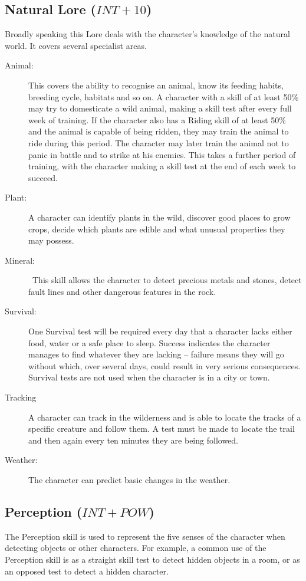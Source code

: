 \subsection{Natural Lore ($INT+10$)}
Broadly speaking this Lore deals with the character’s knowledge of the natural world. It covers several specialist areas.
\begin{description}
	\item[Animal:] This covers the ability to recognise an animal, know its feeding habits, breeding cycle, habitats and so on. A character with a skill of at least 50\% may try to domesticate a wild animal, making a skill test after every full week of training. If the character also has a Riding skill of at least 50\% and the animal is capable of being ridden, they may train the animal to ride during this period. The character may later train the animal not to panic in battle and to strike at his enemies. This takes a further period of training, with the character making a skill test at the end of each week to succeed. 
	\item[Plant:] A character can identify plants in the wild, discover good places to grow crops, decide which plants are edible and what unusual properties they may possess.
	\item[Mineral:]  This skill allows the character to detect precious metals and stones, detect fault lines and other dangerous features in the rock.
	\item[Survival:] One Survival test will be required every day that a character lacks either food, water or a safe place to sleep. Success indicates the character manages to find whatever they are lacking – failure means they will go without which, over several days, could result in very serious consequences. Survival tests are not used when the character is in a city or town. 
	\item[Tracking] A character can track in the wilderness and is able to locate the tracks of a specific creature and follow them. A test must be made to locate the trail and then again every ten minutes they are being followed. 
	\item[Weather:] The character can predict basic changes in the weather.
\end{description}

\subsection{Perception ($INT+POW$)}
The Perception skill is used to represent the five senses of the character when detecting objects or other characters. For example, a common use of the Perception skill is as a straight skill test to detect hidden objects in a room, or as an opposed test to detect a hidden character.

